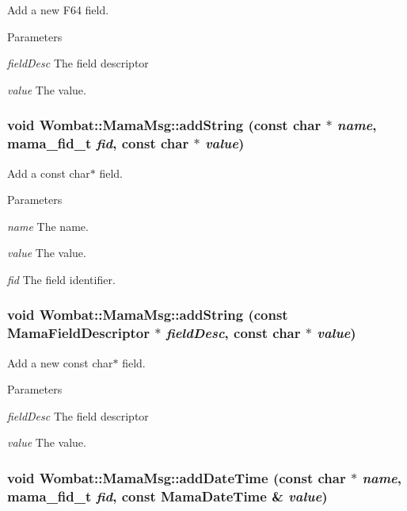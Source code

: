 Add a new F64 field. 
\begin{DoxyParams}{Parameters}
\item[{\em fieldDesc}]The field descriptor \item[{\em value}]The value. \end{DoxyParams}
\hypertarget{classWombat_1_1MamaMsg_a14d258165d74d2045f546a7444cc5ae2}{
\subsubsection[{addString}]{\setlength{\rightskip}{0pt plus 5cm}void Wombat::MamaMsg::addString (const char $\ast$ {\em name}, \/  mama\_\-fid\_\-t {\em fid}, \/  const char $\ast$ {\em value})}}
\label{classWombat_1_1MamaMsg_a14d258165d74d2045f546a7444cc5ae2}


Add a const char$\ast$ field. 
\begin{DoxyParams}{Parameters}
\item[{\em name}]The name. \item[{\em value}]The value. \item[{\em fid}]The field identifier. \end{DoxyParams}
\hypertarget{classWombat_1_1MamaMsg_a0cb3516efcfcdcd93a504ca5e83bbbca}{
\subsubsection[{addString}]{\setlength{\rightskip}{0pt plus 5cm}void Wombat::MamaMsg::addString (const {\bf MamaFieldDescriptor} $\ast$ {\em fieldDesc}, \/  const char $\ast$ {\em value})}}
\label{classWombat_1_1MamaMsg_a0cb3516efcfcdcd93a504ca5e83bbbca}


Add a new const char$\ast$ field. 
\begin{DoxyParams}{Parameters}
\item[{\em fieldDesc}]The field descriptor \item[{\em value}]The value. \end{DoxyParams}
\hypertarget{classWombat_1_1MamaMsg_adf38df8d45f7fa8889a75895abce1ebb}{
\subsubsection[{addDateTime}]{\setlength{\rightskip}{0pt plus 5cm}void Wombat::MamaMsg::addDateTime (const char $\ast$ {\em name}, \/  mama\_\-fid\_\-t {\em fid}, \/  const {\bf MamaDateTime} \& {\em value})}}
\label{classWombat_1_1MamaMsg_adf38df8d45f7fa8889a75895abce1ebb}


